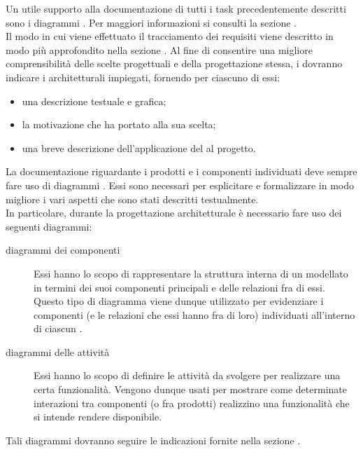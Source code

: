 			Un utile supporto alla documentazione di tutti i task precedentemente descritti sono i diagrammi . Per maggiori informazioni si consulti la sezione .\\
			Il modo in cui viene effettuato il tracciamento dei requisiti viene descritto in modo più approfondito nella sezione .
					 \label{sec:ProgArcDesingPattern}
					Al fine di consentire una migliore comprensibilità delle scelte progettuali e della progettazione stessa, i  dovranno indicare i  architetturali impiegati, fornendo per ciascuno di essi:
					\begin{itemize}
						\item una descrizione testuale e grafica;
						\item la motivazione che ha portato alla sua scelta;
						\item una breve descrizione dell'applicazione del  al progetto.
					\end{itemize}
					 \label{sec:ProgArcUML}
					La documentazione riguardante i prodotti e i componenti individuati deve sempre fare uso di diagrammi . Essi sono necessari per esplicitare e formalizzare in modo migliore i vari aspetti che sono stati descritti testualmente.\\
					In particolare, durante la progettazione architetturale è necessario fare uso dei seguenti diagrammi:
					\begin{description}
						\item[diagrammi dei componenti] Essi hanno lo scopo di rappresentare la struttura interna di un   modellato in termini dei suoi componenti principali e delle relazioni fra di essi. Questo tipo di diagramma viene dunque utilizzato per evidenziare i componenti (e le relazioni che essi hanno fra di loro) individuati all'interno di ciascun  .
						\item[diagrammi delle attività] Essi hanno lo scopo di definire le attività da svolgere per realizzare una certa funzionalità. Vengono dunque usati per mostrare come determinate interazioni tra componenti (o fra prodotti) realizzino una funzionalità che si intende rendere disponibile.
					\end{description}
					Tali diagrammi dovranno seguire le indicazioni fornite nella sezione .

